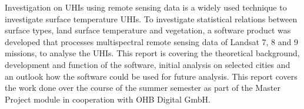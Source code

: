 Investigation on \acfp{UHI} using remote sensing data is a widely used technique to investigate surface temperature \acp{UHI}. 
To investigate statistical relations between surface types, land surface temperature and vegetation, a software product was developed that processes multispectral remote sensing data of Landsat 7, 8 and 9 missions, to analyse the \acp{UHI}. 
This report is covering the theoretical background, development and function of the software, initial analysis on selected cities and an outlook how the software could be used for future analysis. 
This report covers the work done over the course of the summer semester as part of the Master Project module in cooperation with OHB Digital GmbH.


